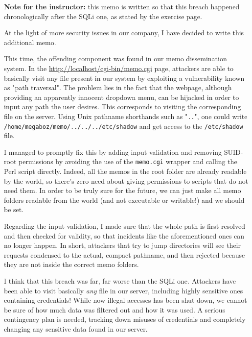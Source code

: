 \documentclass[paper=a4]{../../_global/texMemo}
\begin{document}
\maketitle

\textbf{Note for the instructor:} this memo is written so that this breach happened chronologically after the SQLi one, as stated by the exercise page. 

\vspace{5em}

At the light of more security issues in our company, I have decided to write this additional memo.

This time, the offending component was found in our memo dissemination system. In the \url{http://localhost/cgi-bin/memo.cgi} page, attackers are able to basically visit any file present in our system by exploiting a vulnerability known as "path traversal". The problem lies in the fact that the webpage, although providing an apparently innocent dropdown menu, can be hijacked in order to input any path the user desires. This corresponds to visiting the corresponding file on the server. Using Unix pathname shorthands such as "\verb=..=", one could write \verb=/home/megaboz/memo/../../../etc/shadow= and get access to the \verb=/etc/shadow= file.

I managed to promptly fix this by adding input validation and removing SUID-root permissions by avoiding the use of the \verb=memo.cgi= wrapper and calling the Perl script directly. Indeed, all the memos in the root folder are already readable by the world, so there's zero need about giving permissions to scripts that do not need them. In order to be truly sure for the future, we can just make all memo folders readable from the world (and not executable or writable!) and we should be set.

Regarding the input validation, I made sure that the whole path is first resolved and then checked for validity, so that incidents like the aforementioned ones can no longer happen. In short, attackers that try to jump directories will see their requests condensed to the actual, compact pathname, and then rejected because they are not inside the correct memo folders.

I think that this breach was far, far worse than the SQLi one. Attackers have been able to visit basically \textit{any} file in our server, including highly sensitive ones containing credentials! While now illegal accesses has been shut down, we cannot be sure of how much data was filtered out and how it was used. A serious contingency plan is needed, tracking down misuses of credentials and completely changing any sensitive data found in our server.
\end{document}
